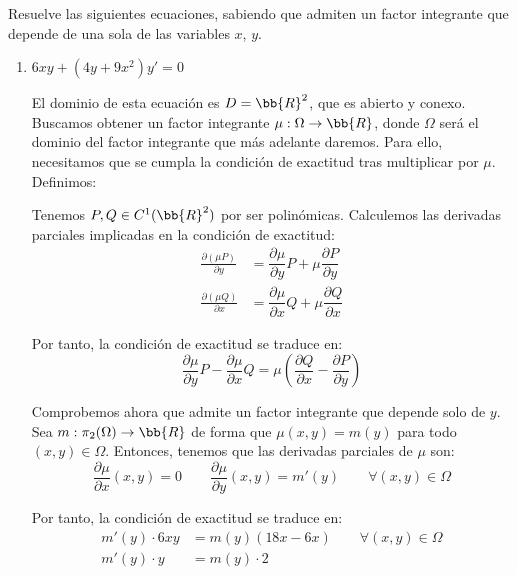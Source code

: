 
\begin{ejercicio}
    Resuelve las siguientes ecuaciones, sabiendo que admiten un factor integrante que depende de una sola de las
    variables $x$, $y$.
    \begin{enumerate}
        \item $6xy + (4y + 9x^2)y' = 0$
        
        El dominio de esta ecuación es $D=\bb{R}^2$, que es abierto y conexo. Buscamos obtener un factor integrante $\mu:\Omega \to\bb{R}$, donde $\Omega$ será el dominio del factor integrante que más adelante daremos. Para ello, necesitamos que se cumpla la condición de exactitud tras multiplicar por $\mu$. Definimos:

        Tenemos $P,Q\in C^1(\bb{R}^2)$ por ser polinómicas. Calculemos las derivadas parciales implicadas en la condición de exactitud:
        \begin{align*}
            \frac{\partial (\mu P)}{\partial y} &= \dfrac{\partial \mu}{\partial y}P+\mu\dfrac{\partial P}{\partial y}\\
            \frac{\partial (\mu Q)}{\partial x} &= \dfrac{\partial \mu}{\partial x}Q+\mu\dfrac{\partial Q}{\partial x}
        \end{align*}

        Por tanto, la condición de exactitud se traduce en:
        \begin{equation*}
            \dfrac{\partial \mu}{\partial y}P- \dfrac{\partial \mu}{\partial x}Q = \mu\left(\dfrac{\partial Q}{\partial x}-\dfrac{\partial P}{\partial y}\right)
        \end{equation*}

        Comprobemos ahora que admite un factor integrante que depende solo de $y$. Sea $m:\pi_2(\Omega)\to \bb{R}$ de forma que $\mu(x,y)=m(y)$ para todo $(x,y)\in\Omega$. Entonces, tenemos que las derivadas parciales de $\mu$ son:
        \begin{equation*}
            \dfrac{\partial \mu}{\partial x}(x,y)=0 \qquad \dfrac{\partial \mu}{\partial y}(x,y)=m'(y)\qquad \forall (x,y)\in\Omega
        \end{equation*}

        Por tanto, la condición de exactitud se traduce en:
        \begin{align*}
            m'(y)\cdot 6xy &= m(y)\left(18x-6x\right) \qquad \forall (x,y)\in\Omega\\
            m'(y)\cdot y &= m(y)\cdot 2
        \end{align*}


\end{enumerate}
\end{ejercicio}
